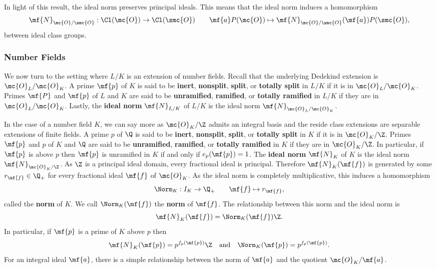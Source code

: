 \documentclass[12pt]{article}
\begin{document}
      In light of this result, the ideal norm preserves principal ideals. This means that the ideal norm induces a homomorphism
      \[
        \mf{N}_{\mc{O}/\smc{O}}:\Cl(\mc{O}) \to \Cl(\smc{O}) \qquad \mf{a}P(\mc{O}) \mapsto \mf{N}_{\mc{O}/\smc{O}}(\mf{a})P(\smc{O}),
      \]
      between ideal class groups.
      \subsubsection*{Number Fields}
        We now turn to the setting where \(L/K\) is an extension of number fields. Recall that the underlying Dedekind extension is \(\mc{O}_{L}/\mc{O}_{K}\). A prime \(\mf{p}\) of \(K\) is said to be \textbf{inert}, \textbf{nonsplit}, \textbf{split}, or \textbf{totally split} in \(L/K\) if it is in \(\mc{O}_{L}/\mc{O}_{K}\). Primes \(\mf{P}\) and \(\mf{p}\) of \(L\) and \(K\) are said to be \textbf{unramified}, \textbf{ramified}, or \textbf{totally ramified} in \(L/K\) if they are in \(\mc{O}_{L}/\mc{O}_{K}\). Lastly, the \textbf{ideal norm} \(\mf{N}_{L/K}\) of \(L/K\) is the ideal norm \(\mf{N}_{\mc{O}_{L}/\mc{O}_{K}}\).

        In the case of a number field \(K\), we can say more as \(\mc{O}_{K}/\Z\) admits an integral basis and the reside class extensions are separable extensions of finite fields. A prime \(p\) of \(\Q\) is said to be \textbf{inert}, \textbf{nonsplit}, \textbf{split}, or \textbf{totally split} in \(K\) if it is in \(\mc{O}_{K}/\Z\). Primes \(\mf{p}\) and \(p\) of \(K\) and \(\Q\) are said to be \textbf{unramified}, \textbf{ramified}, or \textbf{totally ramified} in \(K\) if they are in \(\mc{O}_{K}/\Z\). In particular, if \(\mf{p}\) is above \(p\) then \(\mf{p}\) is unramified in \(K\) if and only if \(e_{p}(\mf{p}) = 1\). The \textbf{ideal norm} \(\mf{N}_{K}\) of \(K\) is the ideal norm \(\mf{N}_{\mc{O}_{K}/\Z}\). As \(\Z\) is a principal ideal domain, every fractional ideal is principal. Therefore \(\mf{N}_{K}(\mf{f})\) is generated by some \(r_{\mf{f}} \in \Q_{+}\) for every fractional ideal \(\mf{f}\) of \(\mc{O}_{K}\). As the ideal norm is completely multiplicative, this induces a homomorphism
        \[
          \Norm_{K}:I_{K} \to \Q_{+} \qquad \mf{f} \mapsto r_{\mf{f}},
        \]
        called the \textbf{norm} of \(K\). We call \(\Norm_{K}(\mf{f})\) the \textbf{norm} of \(\mf{f}\). The relationship between this norm and the ideal norm is
        \[
          \mf{N}_{K}(\mf{f}) = \Norm_{K}(\mf{f})\Z.
        \]
        In particular, if \(\mf{p}\) is a prime of \(K\) above \(p\) then
        \[
          \mf{N}_{K}(\mf{p}) = p^{f_{p}(\mf{p})}\Z \quad \text{and} \quad \Norm_{K}(\mf{p}) = p^{f_{p}(\mf{p})}.
        \]
        For an integral ideal \(\mf{a}\), there is a simple relationship between the norm of \(\mf{a}\) and the quotient \(\mc{O}_{K}/\mf{a}\).
\end{document}
